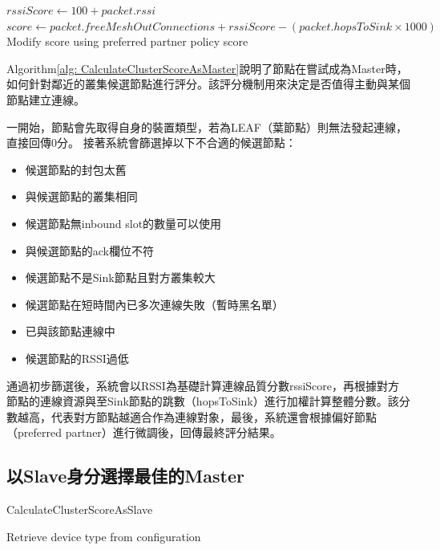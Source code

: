 \begin{ZhChapter}
\begin{algorithm}[H]
\begin{algorithmic}[1]
\State $rssiScore \gets 100 + packet.rssi$
\State $score \gets packet.freeMeshOutConnections + rssiScore - (packet.hopsToSink \times 1000)$
\State Modify score using preferred partner policy
\State \Return score
\end{algorithmic}
\end{algorithm}

Algorithm\ref{alg: CalculateClusterScoreAsMaster}說明了節點在嘗試成為Master時，如何針對鄰近的叢集候選節點進行評分。該評分機制用來決定是否值得主動與某個節點建立連線。

一開始，節點會先取得自身的裝置類型，若為LEAF（葉節點）則無法發起連線，直接回傳0分。
接著系統會篩選掉以下不合適的候選節點：

\begin{itemize}
    \item 候選節點的封包太舊
    \item 與候選節點的叢集相同
    \item 候選節點無inbound slot的數量可以使用
    \item 與候選節點的ack欄位不符
    \item 候選節點不是Sink節點且對方叢集較大
    \item 候選節點在短時間內已多次連線失敗（暫時黑名單）
    \item 已與該節點連線中
    \item 候選節點的RSSI過低
\end{itemize}

通過初步篩選後，系統會以RSSI為基礎計算連線品質分數rssiScore，再根據對方節點的連線資源與至Sink節點的跳數（hopsToSink）進行加權計算整體分數。該分數越高，代表對方節點越適合作為連線對象，最後，系統還會根據偏好節點（preferred partner）進行微調後，回傳最終評分結果。

\subsection{以Slave身分選擇最佳的Master}

\begin{algorithm}[H]
\caption{CalculateClusterScoreAsSlave}
\label{alg: CalculateClusterScoreAsSlave}
\begin{algorithmic}[1]
\State Retrieve device type from configuration
  \EndIf
{}  \EndIf
{}  \EndIf
{}  \EndIf
{}  \EndIf
{}  \EndIf
{}  \EndIf


\end{algorithmic}
\end{algorithm}
\end{ZhChapter}
